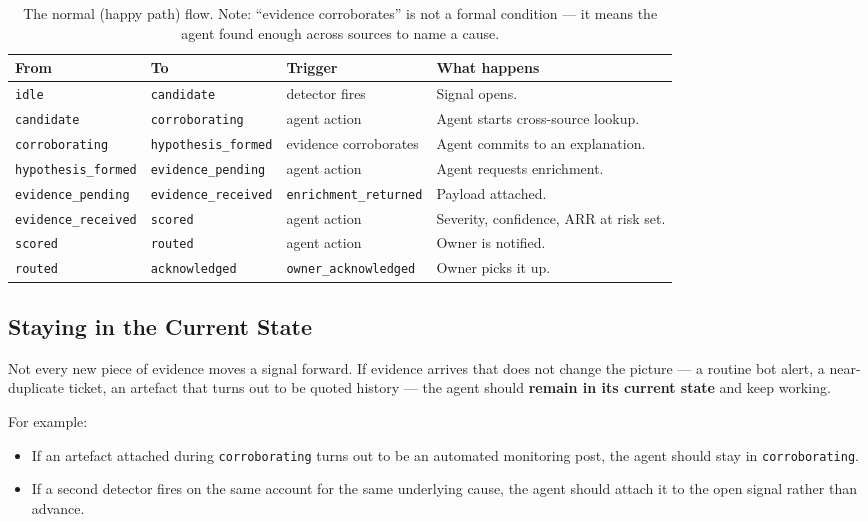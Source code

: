 \documentclass[11pt, a4paper]{article}
\begin{document}
\begin{table}[h]
\centering
\small
\begin{tabular}{llp{3.1cm}p{4.4cm}}
\toprule
\textbf{From} & \textbf{To} & \textbf{Trigger} & \textbf{What happens} \\
\midrule
\texttt{idle} & \texttt{candidate} & detector fires & Signal opens. \\
\texttt{candidate} & \texttt{corroborating} & agent action & Agent starts cross-source lookup. \\
\texttt{corroborating} & \texttt{hypothesis\_formed} & evidence corroborates & Agent commits to an explanation. \\
\texttt{hypothesis\_formed} & \texttt{evidence\_pending} & agent action & Agent requests enrichment. \\
\texttt{evidence\_pending} & \texttt{evidence\_received} & \texttt{enrichment\_returned} & Payload attached. \\
\texttt{evidence\_received} & \texttt{scored} & agent action & Severity, confidence, ARR at risk set. \\
\texttt{scored} & \texttt{routed} & agent action & Owner is notified. \\
\texttt{routed} & \texttt{acknowledged} & \texttt{owner\_acknowledged} & Owner picks it up. \\
\bottomrule
\end{tabular}
\caption{The normal (happy path) flow. Note: ``evidence corroborates'' is not a formal condition --- it means the agent found enough across sources to name a cause.}
\end{table}

\subsection{Staying in the Current State}

Not every new piece of evidence moves a signal forward. If evidence arrives that does not change the picture --- a routine bot alert, a near-duplicate ticket, an artefact that turns out to be quoted history --- the agent should \textbf{remain in its current state} and keep working.

For example:
\begin{itemize}[nosep]
  \item If an artefact attached during \texttt{corroborating} turns out to be an automated monitoring post, the agent should stay in \texttt{corroborating}.
  \item If a second detector fires on the same account for the same underlying cause, the agent should attach it to the open signal rather than advance.
\end{itemize}
\end{document}
